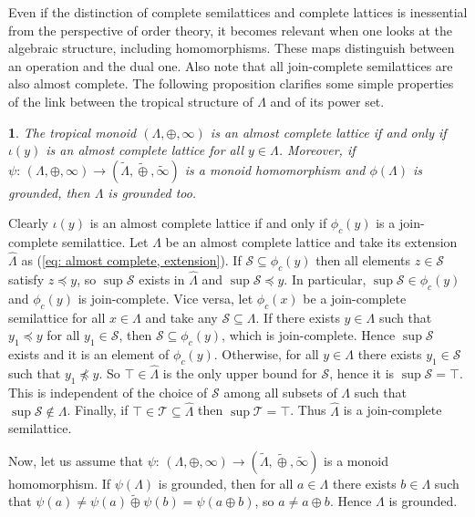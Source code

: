 \documentclass[11pt,british,reqno]{article}
\makeatletter
\numberwithin{equation}{section}
\numberwithin{figure}{section}
\numberwithin{table}{section}
\theoremstyle{definition}
\theoremstyle{definition}
\theoremstyle{plain}
\theoremstyle{plain}
\newtheorem{proposition}{\protect\propositionname}
\theoremstyle{remark}
\theoremstyle{plain}
\numberwithin{equation}{section}
\numberwithin{figure}{section}
\numberwithin{table}{section}
\theoremstyle{plain}
\renewenvironment{proof}[1][\proofname]{\par
  \pushQED{\qed}%
  \normalfont \topsep6\p@\@plus6\p@\relax
  \list{}{%
    \settowidth{\leftmargin}{\itshape\proofname:\hskip\labelsep}%
    \setlength{\labelwidth}{0pt}%
    \setlength{\itemindent}{-\leftmargin}%
  }%
  \item[\hskip\labelsep\itshape#1\@addpunct{:}]\ignorespaces
}{%
  \popQED\endlist\@endpefalse
}
\providecommand{\propositionname}{Proposition}
\makeatother
\begin{document}
Even if the distinction of complete semilattices and complete lattices is inessential from the perspective of order theory, it becomes relevant when one looks at the algebraic structure, including homomorphisms. These maps distinguish between an operation and the dual one. Also note that all join-complete semilattices are also almost complete. The following proposition clarifies some simple properties of the link between the tropical structure of $\Lambda$ and of its power set. 
 
\begin{proposition}
\label{prop: almost completeness} The tropical monoid $(\Lambda,\oplus,\infty)$
is an almost complete lattice if and only if $\iota(y)$ is an almost
complete lattice for all $y\in\Lambda$. Moreover, if $\psi:\,(\Lambda,\oplus,\infty)\longrightarrow(\tilde{\Lambda},\tilde{\oplus},\tilde{\infty})$ is a monoid homomorphism and $\phi(\Lambda)$ is grounded, then $\Lambda$ is grounded too. 
\end{proposition}
\begin{proof} Clearly $\iota(y)$ is an almost complete lattice if and only if $\phi_c(y)$
is a join-complete semilattice. Let $\Lambda$ be an almost complete lattice
and take its extension $\hat{\Lambda}$ as (\ref{eq: almost complete, extension}).
If $\mathcal{S}\subseteq\phi_c(y)$ then all elements $z\in\mathcal{S}$
satisfy $z\preceq y$, so $\sup\mathcal{S}$ exists in $\hat{\Lambda}$
and $\sup\mathcal{S}\preceq y$. In particular, $\sup\mathcal{S}\in\phi_c(y)$
and $\phi_c(y)$ is join-complete. Vice versa, let $\phi_c(x)$
be a join-complete semilattice for all $x\in\Lambda$ and take any $\mathcal{S}\subseteq\Lambda$.
If there exists $y\in\Lambda$ such that $y_{1}\preceq y$ for all
$y_{1}\in\mathcal{S}$, then $\mathcal{S}\subseteq\phi_c(y)$,
which is join-complete. Hence $\sup\mathcal{S}$ exists and it is
an element of $\phi_c(y)$. Otherwise, for all $y\in\Lambda$ there
exists $y_{1}\in\mathcal{S}$ such that $y_{1}\not\preceq y$. So
$\top\in\hat{\Lambda}$ is the only upper bound for $\mathcal{S}$,
hence it is $\sup\mathcal{S}=\top$. This is independent of the choice
of $\mathcal{S}$ among all subsets of $\Lambda$ such that $\sup\mathcal{S}\notin\Lambda$.
Finally, if $\top\in\mathcal{T}\subseteq\hat{\Lambda}$ then $\sup\mathcal{T}=\top$.
Thus $\hat{\Lambda}$ is a join-complete semilattice. 

Now, let us assume that $\psi:\,(\Lambda,\oplus,\infty)\longrightarrow(\tilde{\Lambda},\tilde{\oplus},\tilde{\infty})$ is a monoid homomorphism. If $\psi(\Lambda)$ is grounded, then for all $a\in\Lambda$ there exists $b\in\Lambda$ such that $\psi(a)\neq\psi(a)\tilde{\oplus}\psi(b)=\psi(a\oplus b)$, so $a\neq a\oplus b$. Hence $\Lambda$ is grounded.  
\end{proof}
\end{document}
